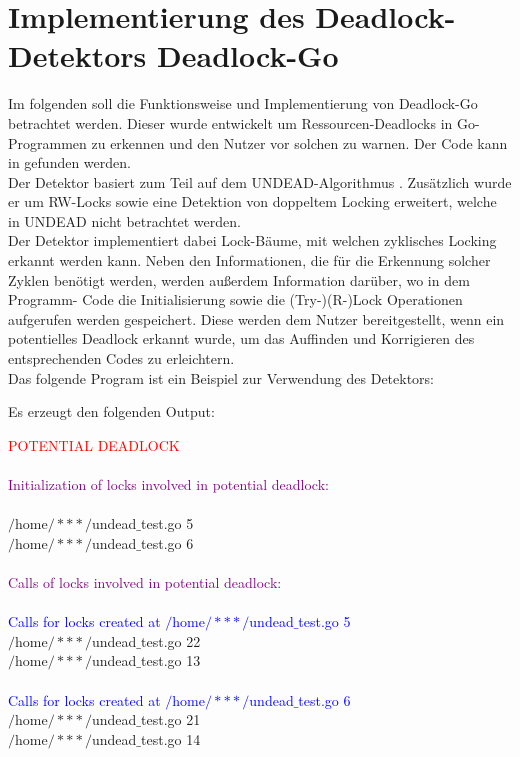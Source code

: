 \chapter{Implementierung des Deadlock-Detektors \glqq Deadlock-Go \grqq} \label{Kap::Implementaion}
Im folgenden soll die Funktionsweise und Implementierung von Deadlock-Go 
betrachtet werden. Dieser wurde entwickelt um Ressourcen-Deadlocks in Go-Programmen
zu erkennen und den Nutzer vor solchen zu warnen. Der Code kann in 
\cite{implementation} gefunden werden.\\
Der Detektor basiert zum Teil auf dem UNDEAD-Algorithmus \cite{zhou}. 
Zusätzlich wurde er um RW-Locks sowie eine Detektion von doppeltem Locking 
erweitert, welche in UNDEAD nicht betrachtet werden.\\
Der Detektor implementiert dabei Lock-Bäume, mit welchen zyklisches Locking 
erkannt werden kann. Neben den Informationen, die für die Erkennung solcher 
Zyklen benötigt werden, werden außerdem Information darüber, wo in dem Programm-
Code die Initialisierung sowie die (Try-)(R-)Lock Operationen aufgerufen werden 
gespeichert. Diese werden dem Nutzer bereitgestellt, wenn ein potentielles 
Deadlock erkannt wurde, um das Auffinden und Korrigieren des entsprechenden Codes
zu erleichtern.\\
Das folgende Program ist ein Beispiel zur Verwendung des Detektors:
\begin{figure}[H]
  
\end{figure}
\newpage
Es erzeugt den folgenden Output:

\begin{mdframed}[leftmargin=10pt,rightmargin=10pt]
\textcolor{red}{POTENTIAL DEADLOCK}\\\\
\textcolor{purple}{Initialization of locks involved in potential deadlock:}\\\\
$/$home$/***/$undead$\_$test.go 5\\
$/$home$/***/$undead$\_$test.go 6\\\\
\textcolor{purple}{Calls of locks involved in potential deadlock:}\\\\
\textcolor{blue}{Calls for locks created at $/$home$/***/$undead$\_$test.go 5}\\
$/$home$/***/$undead$\_$test.go 22\\
$/$home$/***/$undead$\_$test.go 13\\\\
\textcolor{blue}{Calls for locks created at $/$home$/***/$undead$\_$test.go 6}\\
$/$home$/***/$undead$\_$test.go 21\\
$/$home$/***/$undead$\_$test.go 14\
\end{mdframed}

